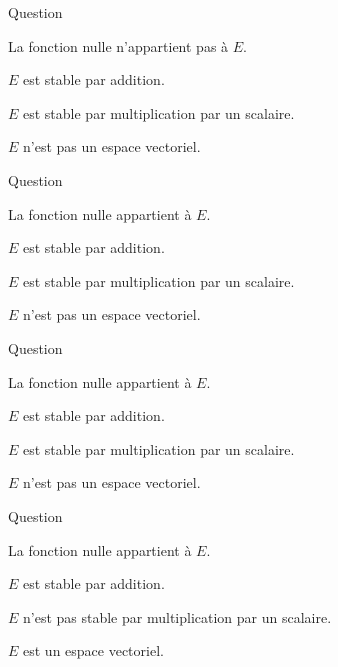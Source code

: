 \begin{multi}[multiple,feedback=
{La fonction nulle n'appartient pas à \(E\), donc \(E\) n'est pas  un espace vectoriel. On vérifie que \(E\) est n'est stable ni par addition ni par  multiplication par un scalaire. 
}]{Question}
    \item* La fonction nulle n'appartient pas à \(E\).
    \item \(E\) est stable par addition.
    \item \(E\) est stable par multiplication par un scalaire.
    \item* \(E\) n'est pas un espace vectoriel.
\end{multi}


\begin{multi}[multiple,feedback=
{La fonction nulle appartient à \(E\), et \(E\) est stable par addition et par multiplication par un scalaire. Donc \(E\) est un espace vectoriel.
}]{Question}
    \item* La fonction nulle appartient à \(E\).
    \item* \(E\) est stable par addition.
    \item* \(E\) est stable par multiplication par un scalaire.
    \item \(E\) n'est pas un espace vectoriel.
\end{multi}


\begin{multi}[multiple,feedback=
{La fonction nulle n'appartient pas à \(E\), donc \(E\) n'est pas un espace vectoriel. Par ailleurs, \(E\) n'est sable ni par addition ni par multiplication par un scalaire.
}]{Question}
    \item La fonction nulle appartient à \(E\).
    \item \(E\) est stable par addition.
    \item \(E\) est stable par multiplication par un scalaire.
    \item* \(E\) n'est pas un espace vectoriel.
\end{multi}


\begin{multi}[multiple,feedback=
{La fonction nulle appartient à \(E\), et \(E\) est stable par addition et par multiplication par un scalaire. Donc \(E\) est un espace vectoriel.
}]{Question}
    \item* La fonction nulle appartient à \(E\).
    \item* \(E\) est stable par addition.
    \item \(E\) n'est pas stable par multiplication par un scalaire.
    \item* \(E\) est un espace vectoriel.
\end{multi}


